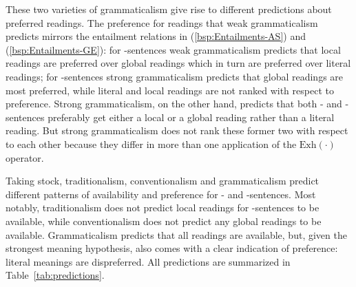 \documentclass[fleqn,reqno,10pt,draft]{article}
\newcommand{\as}{\acro{as}}
\renewcommand{\es}{\acro{es}}
\newcommand{\exh}{\ensuremath{\mathrm{Exh}}}
\begin{document}
These two varieties of grammaticalism give rise to different
predictions about preferred readings. The preference for readings that
weak grammaticalism predicts mirrors the entailment relations in
(\ref{bsp:Entailments-AS}) and (\ref{bsp:Entailments-GE}): for
\as-sentences weak grammaticalism predicts that local readings are
preferred over global readings which in turn are preferred over
literal readings; for \es-sentences strong grammaticalism predicts
that global readings are most preferred, while literal and local
readings are not ranked with respect to preference. Strong
grammaticalism, on the other hand, predicts that both \as- and
\es-sentences preferably get either a local or a global reading rather
than a literal reading. But strong grammaticalism does not rank these
former two with respect to each other because they differ in more than
one application of the $\exh(\cdot)$ operator.

\medskip

Taking stock, traditionalism, conventionalism and grammaticalism
predict different patterns of availability and preference for \as- and
\es-sentences. Most notably, traditionalism does not predict local
readings for \es-sentences to be available, while conventionalism does
not predict any global readings to be available. Grammaticalism
predicts that all readings are available, but, given the strongest
meaning hypothesis, also comes with a clear indication of preference:
literal meanings are dispreferred. All predictions are summarized in
Table~\ref{tab:predictions}.
\end{document}
